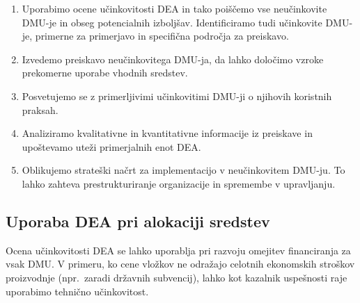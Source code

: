 \documentclass[12pt,a4paper]{article}
\theoremstyle{definition}
\begin{document}
\begin{enumerate}
    \item Uporabimo ocene učinkovitosti DEA in tako poiščemo
    vse neučinkovite DMU-je in obseg potencialnih izboljšav. 
    Identificiramo tudi učinkovite DMU-je, primerne za 
    primerjavo in specifična področja za preiskavo.
    
    \item Izvedemo preiskavo neučinkovitega 
    DMU-ja, da lahko določimo vzroke prekomerne 
    uporabe vhodnih sredstev.
    
    \item Posvetujemo se z primerljivimi učinkovitimi DMU-ji
    o njihovih koristnih praksah.
    
    \item Analiziramo kvalitativne in kvantitativne informacije
    iz preiskave in upoštevamo uteži primerjalnih enot DEA.
    
    \item Oblikujemo strateški načrt za implementacijo v 
    neučinkovitem DMU-ju. To lahko zahteva prestrukturiranje 
    organizacije in spremembe v upravljanju.
\end{enumerate}

\subsection{Uporaba DEA pri alokaciji sredstev}

Ocena učinkovitosti DEA se lahko uporablja pri razvoju
omejitev financiranja za vsak DMU. V primeru, ko cene
vložkov ne odražajo celotnih ekonomskih stroškov proizvodnje
(npr.\ zaradi državnih subvencij), lahko kot kazalnik 
uspešnosti raje uporabimo tehnično učinkovitost. 
\cite{Yaisawarng2002}
\end{document}
